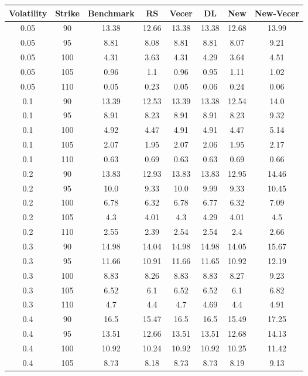 \documentclass{article}
\begin{document}
\scriptsize
\begin{table}[H]
  \begin{tabular}{|c|c|c|c|c|c|c|c|}
  \hline
  Volatility & Strike & Benchmark & RS & Vecer & DL & New & New-Vecer \\
  \hline
  0.05 & 90 & 13.38 & 12.66 & 13.38 & 13.38 & 12.68 & 13.99 \\
  0.05 & 95 & 8.81 & 8.08 & 8.81 & 8.81 & 8.07 & 9.21 \\
  0.05 & 100 & 4.31 & 3.63 & 4.31 & 4.29 & 3.64 & 4.51 \\
  0.05 & 105 & 0.96 & 1.1 & 0.96 & 0.95 & 1.11 & 1.02 \\
  0.05 & 110 & 0.05 & 0.23 & 0.05 & 0.06 & 0.24 & 0.06 \\
  0.1 & 90 & 13.39 & 12.53 & 13.39 & 13.38 & 12.54 & 14.0 \\
  0.1 & 95 & 8.91 & 8.23 & 8.91 & 8.91 & 8.23 & 9.32 \\
  0.1 & 100 & 4.92 & 4.47 & 4.91 & 4.91 & 4.47 & 5.14 \\
  0.1 & 105 & 2.07 & 1.95 & 2.07 & 2.06 & 1.95 & 2.17 \\
  0.1 & 110 & 0.63 & 0.69 & 0.63 & 0.63 & 0.69 & 0.66 \\
  0.2 & 90 & 13.83 & 12.93 & 13.83 & 13.83 & 12.95 & 14.46 \\
  0.2 & 95 & 10.0 & 9.33 & 10.0 & 9.99 & 9.33 & 10.45 \\
  0.2 & 100 & 6.78 & 6.32 & 6.78 & 6.77 & 6.32 & 7.09 \\
  0.2 & 105 & 4.3 & 4.01 & 4.3 & 4.29 & 4.01 & 4.5 \\
  0.2 & 110 & 2.55 & 2.39 & 2.54 & 2.54 & 2.4 & 2.66 \\
  0.3 & 90 & 14.98 & 14.04 & 14.98 & 14.98 & 14.05 & 15.67 \\
  0.3 & 95 & 11.66 & 10.91 & 11.66 & 11.65 & 10.92 & 12.19 \\
  0.3 & 100 & 8.83 & 8.26 & 8.83 & 8.83 & 8.27 & 9.23 \\
  0.3 & 105 & 6.52 & 6.1 & 6.52 & 6.52 & 6.1 & 6.82 \\
  0.3 & 110 & 4.7 & 4.4 & 4.7 & 4.69 & 4.4 & 4.91 \\
  0.4 & 90 & 16.5 & 15.47 & 16.5 & 16.5 & 15.49 & 17.25 \\
  0.4 & 95 & 13.51 & 12.66 & 13.51 & 13.51 & 12.68 & 14.13 \\
  0.4 & 100 & 10.92 & 10.24 & 10.92 & 10.92 & 10.25 & 11.42 \\
  0.4 & 105 & 8.73 & 8.18 & 8.73 & 8.73 & 8.19 & 9.13 \\

\end{tabular}
\end{table}
\end{document}
